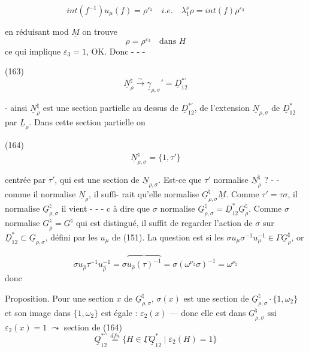 \newpage


$$int(f^{-1})u_\mu(f) = \rho^{\varepsilon_3} \quad i.e. \quad \lambda_1^\nu \rho = int(f)\rho^{\varepsilon_3}$$

en réduisant mod $\underline{M}$ on trouve
$$ \rho = \rho^{\varepsilon_3} \quad \text{dans } H$$
ce qui implique $\varepsilon_3=1$, OK. Donc - - -

(163) $$ \underline{N}_{\rho}^\natural \xrightarrow{\sim} \underline{\gamma}_{\rho,\sigma}' = \underline{D}_{12}^{*\prime} $$

- ainsi $\underline{N}_\rho^\natural$ est une section partielle
au dessus de $\underline{D}_{12}^{*\prime}$, de l'extension
$\underline{N}_{\rho,\sigma}$ de $\underline{D}_{12}^*$ par $\underline{L}_\rho$.
Dans cette section partielle on

(164) $$ \underline{N}_{\rho,\sigma}^\natural = \{1,\tau'\} $$

centrée par $\tau'$, qui est une section
de $\underline{N}_{\rho,\sigma}$. Est-ce que $\tau'$ normalise
$\underline{N}_\rho^\natural$ ? - - comme il normalise $\underline{N}_\rho$, il suffi-
rait qu'elle normalise $\underline{G}_{\rho,\sigma}^\natural \underline{M}$.
Comme $\tau' = \tau \sigma$, il normalise $\underline{G}_{\rho,\sigma}^\natural$
il vient - - - c à dire
que $\sigma$ normalise $\underline{G}_{\rho,\sigma}^\natural = \underline{D}_{12}^* \underline{G}_\rho^\natural$.
Comme $\sigma$ normalise $\underline{G}_\rho^\natural = \underline{G}^\natural$ qui est
distingué, il suffit de regarder l'action
de $\sigma$ sur $\underline{D}_{12}^* \subset \underline{G}_{\rho,\sigma}$, défini par
les $u_\mu$ de (151). La question est si
les $\sigma u_\mu \sigma^{-1} u_\mu^{-1} \in \Gamma \underline{G}_\rho^\natural$, or

\newpage


$$ \sigma u_{\hat{\rho}} \tau^{-1} u_{\hat{\rho}}^{-1} = \sigma \overbrace{u_{\hat{\rho}}(\tau)^{-1}} = \sigma (\omega^{\nu_{2}} \sigma)^{-1} = \omega^{\nu_{2}} $$
donc

Proposition. Pour une section $x$ de $\underline{G}_{\rho,\sigma}^\natural$,
$\sigma(x)$ est une section de $\underline{G}_{\rho,\sigma}^\natural \cdot \{1, \omega_2\}$ et son
image dans $\{1, \omega_2\}$ est égale : $\varepsilon_2(x)$ —
donc elle est dans $\underline{G}_{\rho,\sigma}^\natural$ ssi $\varepsilon_2(x) = 1$ $\leadsto$
section de
(164) $$ \underline{Q}_{12}^{* \prime\prime} \overset{dfn}{=} \{ H \in \underline{\Gamma} \underline{Q}_{12}^* \mid \varepsilon_2(H) = 1 \} $$

